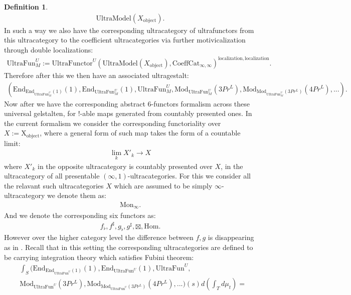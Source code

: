 \documentclass[12pt]{article}
\theoremstyle{definition}
\newtheorem{definition}{Definition}
\begin{document}
\begin{definition}
\begin{align}
\mathrm{UltraModel}(X_\mathrm{object}).
\end{align}
In such a way we also have the corresponding ultracategory of ultrafunctors from this ultracategory to the coefficient ultracategories via further motivicalization through double localizations:
\begin{align}
\mathrm{UltraFun}_M^U:=\mathrm{UltraFunctor}^U(\mathrm{UltraModel}(X_\mathrm{object}),\mathrm{CoeffCat}_{\infty,\infty})^{\mathrm{localization}, \mathrm{localization}}.
\end{align}
Therefore after this we then have an associated ultragestalt:
\begin{align}
(\mathrm{End}_{\mathrm{End}_{\mathrm{UltraFun}_M^U}(1)}(1),\mathrm{End}_{\mathrm{UltraFun}_M^U}(1),\mathrm{UltraFun}_M^U,\mathrm{Mod}_{\mathrm{UltraFun}_M^U}(3Pr^L),\mathrm{Mod}_{\mathrm{Mod}_{\mathrm{UltraFun}_M^U}(3Pr^L)}(4Pr^L),...).
\end{align}
Now after \cite{5S5} we have the corresponding abstract 6-functors formalism across these universal gelstalten, for $!$-able maps generated from countably presented ones. In the current formalism we consider the corresponding functoriality over $X:=\mathrm{X}_\mathrm{object}$, where a general form of such map takes the form of a countable limit:
\begin{align}
\lim_k X'_k \rightarrow X
\end{align}
where $X'_k$ in the opposite ultracategory is countably presented over $X$, in the ultracategory of all presentable $(\infty,1)$-ultracategories. For this we consider all the relavant such ultracategories $X$ which are assumed to be simply $\infty$-ultracategory we denote them as:
\begin{align}
\mathrm{Mon}_\infty.
\end{align}
And we denote the corresponding six functors as:
\begin{align}
f_\flat, f^\sharp, g_\flat, g^\sharp, \boxtimes, \mathrm{Hom}.  
\end{align}
However over the higher category level the difference between $f,g$ is disappearing as in \cite{5S5}. Recall that in this setting the corresponding ultracategories are defined to be carrying integration theory which satisfies Fubini theorem:
\begin{align}
&\int_S (\mathrm{End}_{\mathrm{End}_{\mathrm{UltraFun}^U}(1)}(1),\mathrm{End}_{\mathrm{UltraFun}^U}(1),\mathrm{UltraFun}^U,\\
&\mathrm{Mod}_{\mathrm{UltraFun}^U}(3Pr^L),\mathrm{Mod}_{\mathrm{Mod}_{\mathrm{UltraFun}^U}(3Pr^L)}(4Pr^L),...)(s)d(\int_T d\mu_t) =\\ 

\end{align}
\end{definition}
\end{document}
